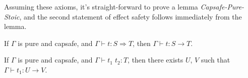 Assuming these axioms, it's straight-forward to prove a lemma
\emph{Capsafe-Pure-Stoic}, and the second statement of effect safety
follows immediately from the lemma.

\begin{lemma}
  If $\Gamma$ is pure and capsafe,  and $\Gamma \vdash t : S
  \Rightarrow T$, then $\Gamma \vdash t : S \to T$.
\end{lemma}

\begin{theorem}
  If $\Gamma$ is pure and capsafe, and $\Gamma \vdash t_1 \; t_2 : T$,
  then there exists $U$, $V$ such that $\Gamma \vdash t_1 : U \to V$.
\end{theorem}
